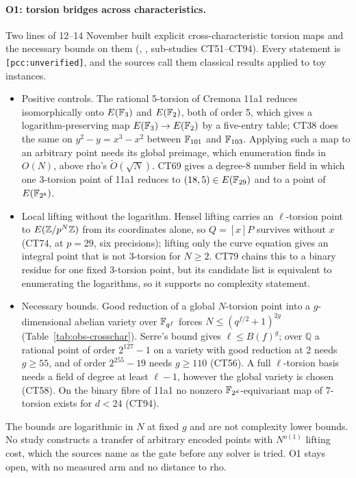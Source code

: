 \paragraph{O1: torsion bridges across characteristics.} Two lines of
12--14 November built explicit cross-characteristic torsion maps and the
necessary bounds on them
(,
,
sub-studies CT51--CT94). Every statement is \texttt{[pcc:unverified]}, and
the sources call them classical results applied to toy instances.
\begin{itemize}
\item Positive controls. The rational 5-torsion of Cremona 11a1 reduces
  isomorphically onto $E(\mathbb{F}_3)$ and $E(\mathbb{F}_2)$, both of order 5, which
  gives a logarithm-preserving map $E(\mathbb{F}_3)\to E(\mathbb{F}_2)$ by a five-entry
  table; CT38 does the same on $y^2-y=x^3-x^2$ between $\mathbb{F}_{101}$ and
  $\mathbb{F}_{103}$. Applying such a map to an arbitrary point needs its global
  preimage, which enumeration finds in $O(N)$, above rho's
  $\tilde O(\sqrt N)$. CT69 gives a degree-8 number field in which one
  3-torsion point of 11a1 reduces to $(18,5)\in E(\mathbb{F}_{29})$ and to a point
  of $E(\mathbb{F}_{2^8})$.
\item Local lifting without the logarithm. Hensel lifting carries an
  $\ell$-torsion point to $E(\mathbb{Z}/p^N\mathbb{Z})$ from its coordinates alone, so
  $Q=[x]P$ survives without $x$ (CT74, at $p=29$, six precisions); lifting
  only the curve equation gives an integral point that is not 3-torsion
  for $N\ge2$. CT79 chains this to a binary residue for one fixed 3-torsion
  point, but its candidate list is equivalent to enumerating the
  logarithms, so it supports no complexity statement.
\item Necessary bounds. Good reduction of a global $N$-torsion point into
  a $g$-dimensional abelian variety over $\mathbb{F}_{q^f}$ forces
  $N\le(q^{f/2}+1)^{2g}$ (Table~\ref{tab:obs-crosschar}). Serre's bound
  gives $\ell\le B(f)^g$; over $\mathbb{Q}$ a rational point of order
  $2^{127}-1$ on a variety with good reduction at 2 needs $g\ge55$, and of
  order $2^{255}-19$ needs $g\ge110$ (CT56). A full $\ell$-torsion basis
  needs a field of degree at least $\ell-1$, however the global variety is
  chosen (CT58). On the binary fibre of 11a1 no nonzero
  $\mathbb{F}_{2^d}$-equivariant map of 7-torsion exists for $d<24$ (CT94).
\end{itemize}
The bounds are logarithmic in $N$ at fixed $g$ and are not complexity
lower bounds. No study constructs a transfer of arbitrary encoded points
with $N^{o(1)}$ lifting cost, which the sources name as the gate before
any solver is tried. O1 stays open, with no measured arm and no distance
to rho.

